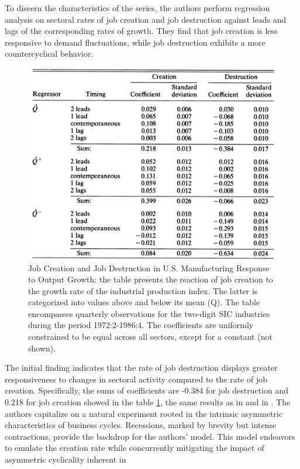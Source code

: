 \documentclass[12pt]{report}
\begin{document}
To discern the characteristics of the series, the authors perform regression analysis on sectoral rates of job creation
and job destruction against leads and lags of the corresponding rates of growth. They find that job creation is less
responsive to demand fluctuations, while job destruction exhibits a more countercyclical behavior. 
\begin{figure}
    \centering
    \includegraphics[scale = 0.4]{figure/Plot2.3.png}
    \caption{Job Creation and Job Destruction in U.S. Manufacturing Response to Output Growth: the table presents the reaction of job creation to the growth rate of the industrial
    production index. The latter is categorized into values above and below its mean (Q). The table encompasses
    quarterly observations for the two-digit SIC industries during the period 1972:2-1986:4. The coefficients are
    uniformly constrained to be equal across all sectors, except for a constant (not shown).}
    \label{Table 2.1.}
\end{figure}
The initial finding indicates that the rate of job destruction displays greater responsiveness to changes in sectoral
activity compared to the rate of job creation. Specifically, the sums of coefficients are -0.384 for job destruction and
0.218 for job creation showed in the table \ref{Table 2.1.}, the same results as in \cite{DAvHalt90,DavHalt92} and in
\cite{BlaDia90}.
The authors capitalize on a natural experiment rooted in the intrinsic asymmetric characteristics of business cycles.
Recessions, marked by brevity but intense contractions, provide the backdrop for the authors' model. This model
endeavors to emulate the creation rate while concurrently mitigating the impact of asymmetric cyclicality inherent in
\end{document}
